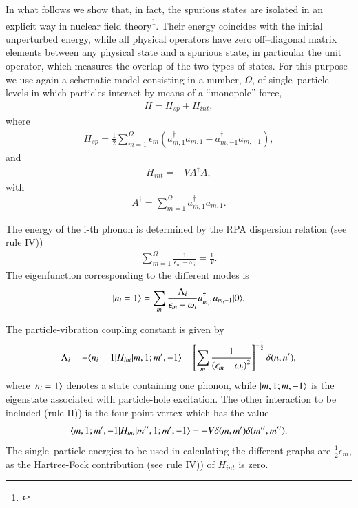 In what follows we show that, in fact, the spurious states are isolated in an
explicit way in  nuclear field theory\footnote{\cite{Broglia:76}}. Their energy coincides with the
initial unperturbed  energy, while all physical operators have zero off--diagonal
matrix elements between any physical state and a spurious state, in particular
the unit operator, which measures the overlap of the two types of states.
For this purpose we use again a schematic model consisting in a number, $\Omega$,
of single--particle levels in which particles interact by means of a ``monopole''
force,
 \begin{align}\label{eqC1A46} 
H=H_{sp}+H_{int},
 \end{align}
where
 \begin{align}\label{eqC1A47} 
H_{sp}=\frac{1}{2}\sum_{m=1}^\Omega\epsilon_m\left(a^\dagger_{m,1}a_{m,1}-a^\dagger_{m,-1}a_{m,-1}\right),
 \end{align}
and
 \begin{align}\label{eqC1A48} 
H_{int}=-VA^\dagger A,
 \end{align}
with
 \begin{align}\label{eqC1A49} 
 A^\dagger=\sum_{m=1}^\Omega a^\dagger_{m,1}a_{m,1}.
 \end{align}

The energy of the i-th phonon is determined by the RPA dispersion relation (see rule IV)) 
 \begin{align}\label{eqC1A50} 
\sum_{m=1}^{\Omega}\frac{1}{\epsilon_m-\omega_i}=\frac{1}{V}.
 \end{align}
The eigenfunction corresponding to the different modes is 
 \begin{align}\label{eqC1A51} 
|{n_i=1} \rangle=\sum_m\frac{\Lambda_i}{\epsilon_m-\omega_i}a^\dagger_{m,1}a_{m,-1}|{0} \rangle.
 \end{align}


The particle-vibration coupling constant is given by 
 \begin{align}\label{eqC1A52} 
\Lambda_i=-\langle {n_i=1|H_{int}|m,1;m',-1} \rangle=\left[\sum_m\frac{1}{\left(\epsilon_m-\omega_i\right)^2}\right]^{-\frac{1}{2}}\delta(n,n'),
 \end{align} 
where $|{n_i=1} \rangle$ denotes a state containing one phonon, while $|{m,1;m,-1} \rangle$ is the eigenstate associated with particle-hole excitation. The other interaction to be included (rule II)) is the four-point vertex which has the value 
 \begin{align}\label{eqC1A53} 
\langle {m,1;m',-1|H_{int}|m'',1;m',-1} \rangle=-V\delta(m,m')\delta(m'',m'').
 \end{align} 
The single--particle energies to be used in calculating the different graphs are $\frac{1}{2}\epsilon_m$, as the Hartree-Fock contribution (see rule IV)) of $H_{int}$ is zero. 


